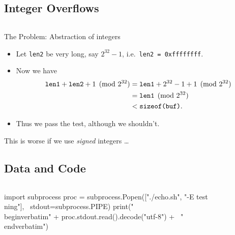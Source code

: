 
\subsection{Integer Overflows}

\begin{frame}[fragile]
  \inputminted{C}{combine.c}
\end{frame}

\begin{frame}
  \begin{alertblock}{The Problem: Abstraction of integers}
    \begin{itemize}
      \item Let \texttt{len2} be very long, say \(2^{32} - 1\), i.e.\ 
        \texttt{len2 = 0xffffffff}.

      \item Now we have
        \begin{align*}
          \text{\texttt{len1}} + \text{\texttt{len2}} 
          + 1 \pmod{2^{32}}
          &= \text{\texttt{len1}} + 2^{32} - 1 + 1 \pmod{2^{32}} \\
          &= \text{\texttt{len1}} \pmod{2^{32}} \\
          &< \text{\texttt{sizeof(buf)}}.
        \end{align*}

      \item Thus we pass the test, although we shouldn't.
    \end{itemize}
  \end{alertblock}
\end{frame}

\begin{frame}
  \begin{remark}
    This is worse if we use \emph{signed} integers \dots
  \end{remark}
\end{frame}

\subsection{Data and Code}

\begin{frame}[fragile]
  \begin{example}
    \inputminted{sh}{echo.sh}
    \begin{pycode}[echo.sh]
import subprocess
proc = subprocess.Popen(["./echo.sh", "-E test\\ning"], \
stdout=subprocess.PIPE)
print("\\begin{verbatim}" + proc.stdout.read().decode("utf-8") + \
"\\end{verbatim}")
    \end{pycode}
  \end{example}
\end{frame}

